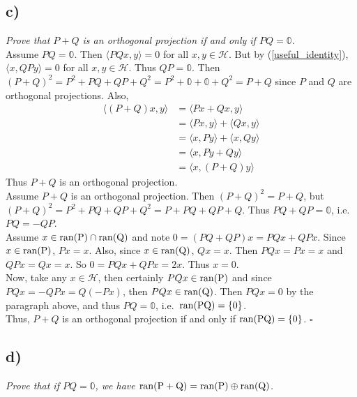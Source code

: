\documentclass[12pt]{article}
\theoremstyle{plain}
\begin{document}
\subsection*{ c)}
\emph{Prove that $P + Q$ is an orthogonal projection if and only if $PQ = \mathbb{0}$.} \\

Assume $PQ = \mathbb{0}$.  Then $\langle PQx, y \rangle = 0$ for all $x,y \in \mathcal{H}$.  But by (\ref{useful_identity}), $\langle x, QPy \rangle = 0$ for all $x,y \in \mathcal{H}$.  Thus $QP = \mathbb{0}$.  Then $(P + Q)^2 = P^2 + PQ + QP + Q^2 = P^2 + \mathbb{0} + \mathbb{0} + Q^2 = P + Q$ since $P$ and $Q$ are orthogonal projections.  Also,
\begin{align*}
    \langle (P + Q)x, y \rangle &= \langle Px + Qx, y\rangle \\
    &= \langle Px, y\rangle + \langle Qx, y\rangle \\
    &= \langle x, Py\rangle + \langle x, Qy\rangle \\
    &= \langle x, Py + Qy\rangle \\
    &= \langle x, (P + Q)y\rangle
\end{align*}
Thus $P + Q$ is an orthogonal projection. \\

Assume $P + Q$ is an orthogonal projection.  Then $(P + Q)^2 = P + Q$, but $(P + Q)^2 = P^2 + PQ + QP + Q^2 = P + PQ + QP + Q$.  Thus $PQ + QP = \mathbb{0}$, i.e.~$PQ = -QP$. \\

Assume $x \in \rm{ran}(P)\cap\rm{ran}(Q)$ and note $0 = (PQ + QP)x = PQx + QPx$.  Since $x \in \rm{ran}(P)$, $Px = x$.  Also, since $x \in \rm{ran}(Q)$, $Qx = x$.  Then $PQx = Px = x$ and $QPx = Qx = x$.  So $0 = PQx + QPx = 2x$.  Thus $x = 0$. \\

Now, take any $x \in \mathcal{H}$, then certainly $PQx \in \rm{ran}(P)$ and since $PQx = -QPx = Q(-Px)$, then $PQx \in \rm{ran}(Q)$.  Then $PQx = 0$ by the paragraph above, and thus $PQ = \mathbb{0}$, i.e.~$\rm{ran}(PQ) = \{0\}$. \\

Thus, $P + Q$ is an orthogonal projection if and only if $\rm{ran}(PQ) = \{0\}$.  \hfill $\square$

\subsection*{ d)}
\emph{Prove that if $PQ = \mathbb{0}$, we have $\rm{ran}(P+Q) = \rm{ran}(P) \oplus \rm{ran}(Q)$.} \\
\end{document}

